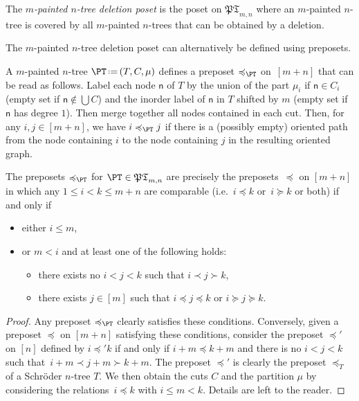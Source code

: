 \documentclass[AHL,Unicode,longabstracts,published]{cedram}
\newcommand{\f}[1]{\mathfrak{#1}}
\newcommand{\eqdef}{\mbox{\,\raisebox{0.2ex}{\scriptsize\ensuremath{\mathrm:}}\ensuremath{=}\,}}
\newcommand{\ie}{i.e.~}
\newcommand{\node}[1]{\mathsf{#1}}
\begin{document}
\begin{defi}\label{def:paintedTreeDeletionPoset}
The
\emph{$m$-painted $n$-tree deletion poset} is the poset on $\f{PT}_{m,n}$ where an $m$-painted $n$-tree is covered by all $m$-painted $n$-trees that can be obtained by a deletion.
\end{defi}

The $m$-painted $n$-tree deletion poset can alternatively be defined using preposets.

\begin{defi}\label{def:paintedTreePreposet}
A $m$-painted $n$-tree $\PT \eqdef (T, C, \mu)$ defines a preposet $\preccurlyeq_{\PT}$ on~$[m+n]$ that can be read as follows. Label each node $\node{n}$ of $T$ by the union of the part $\mu_i$ if $\node{n} \in C_i$ (empty set if $\node{n} \notin \bigcup C$) and the inorder label of $\node{n}$ in $T$ shifted by $m$ (empty set if $\node{n}$ has degree $1$). Then merge together all nodes contained in each cut. Then, for any $i,j \in [m+n]$, we have $i \preccurlyeq_{\PT} j$ if there is a (possibly empty) oriented path from the node containing $i$ to the node containing $j$ in the resulting oriented graph.
\end{defi}

\begin{prop}\label{prop:characterizationPaintedTreePreposets}
The preposets $\preccurlyeq_{\PT}$ for $\PT \in \f{PT}_{m,n}$ are precisely the preposets~$\preccurlyeq$ on $[m+n]$ in which any $1 \le i < k \le m+n$ are comparable (\ie $i \preccurlyeq k$ or~$i \succcurlyeq k$ or both) if and only if
\begin{itemize}
\item either $i \le m$,
\item or $m < i$ and at least one of the following holds:
\begin{itemize}
\item there exists no $i < j < k$ such that $i \prec j \succ k$,
\item there exists $j \in [m]$ such that $i \preccurlyeq j \preccurlyeq k$ or $i \succcurlyeq j \succcurlyeq k$.
\end{itemize}
\end{itemize}
\end{prop}

\begin{proof}
Any preposet $\preccurlyeq_{\PT}$ clearly satisfies these conditions. Conversely, given a preposet $\preccurlyeq$ on ${[m+n]}$ satisfying these conditions, consider the preposet $\preccurlyeq'$ on $[n]$ defined by $i \preccurlyeq' k$ if and only if ${i + m \preccurlyeq k+m}$ and there is no $i < j < k$ such that~$i + m \prec j + m \succ k + m$. The preposet $\preccurlyeq'$ is clearly the preposet $\preccurlyeq_T$ of a Schr\"oder $n$-tree $T$. We then obtain the cuts $C$ and the partition $\mu$ by considering the relations~$i \preccurlyeq k$ with $i \le m < k$. Details are left to the reader.
\end{proof}
\end{document}
